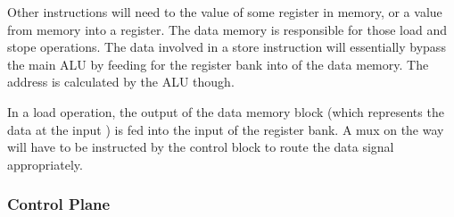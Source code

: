 Other instructions will need to  the value of some register in memory, or  a value from memory into a register. The data memory is responsible for those load and stope operations. The data involved in a store instruction will essentially bypass the main ALU by feeding  for the register bank into  of the data memory. The address is calculated by the ALU though.

In a load operation, the  output of the data memory block (which represents the data at the input ) is fed into the  input of the register bank. A mux on the way will have to be instructed by the control block to route the data signal appropriately.


\subsubsection{Control Plane}
\label{sec:bg:machine:control_plane}




